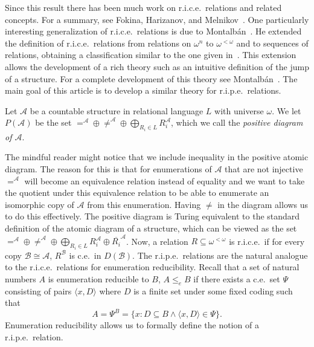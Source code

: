 \documentclass[11pt]{amsart}
\newcommand{\A}{{\mathcal{A}}}
\newcommand{\B}{{\mathcal{B}}}
\renewcommand{\bar}[1]{\overline{#1}}
\begin{document}
Since this result there has been much work on r.i.c.e.\ relations and related concepts. For a summary, see Fokina, Harizanov, and Melnikov~\cite{fokina2014}. One particularly interesting generalization of r.i.c.e.\ relations is due to Montalb\'an~\cite{montalban2012}. He extended the definition of r.i.c.e.\ relations from relations on $\omega^n$ to $\omega^{<\omega}$ and to sequences of relations, obtaining a classification similar to the one given in~\cite{ash1989,chisholm1990}. This extension allows the development of a rich theory such as an intuitive definition of the jump of a structure. For a complete development of this theory see Montalb\'an~\cite{montalban2021a}. The main goal of this article is to develop a similar theory for r.i.p.e.\ relations.%
\begin{defn}\label{def:posdiagram}
Let $\A$ be a countable structure in relational language $L$ with universe $\omega$. We let $P(\A)$ be the set $=^\A\oplus \neq^\A\oplus\bigoplus_{R_i\in L}R_i^\A$, which we call the \emph{positive diagram of $\A$}.
\end{defn}
The mindful reader might notice that we include inequality in the positive atomic diagram. The reason for this is that for enumerations of $\A$ that are not injective $=^\A$ will become an equivalence relation instead of equality and we want to take the quotient under this equivalence relation to be able to enumerate an isomorphic copy of $\A$ from this enumeration. Having $\neq$ in the diagram allows us to do this effectively. The positive diagram is Turing equivalent to the standard definition of the atomic diagram of a structure, which can be viewed as the set $=^\A\oplus \neq^\A\oplus\bigoplus_{R_i\in L}R_i^\A\oplus \bar{R_i}^\A$. Now, a relation $R\subseteq\omega^{<\omega}$ is r.i.c.e.\ if for every copy $\B\cong \A$, $R^\B$ is c.e.\ in $D(\B)$. 
The r.i.p.e.\ relations are the natural analogue to the r.i.c.e.\ relations for enumeration reducibility. Recall that a set of natural numbers $A$ is enumeration reducible to $B$, $A\leq_e B$ if there exists a c.e.\ set $\Psi$ consisting of pairs $\langle x,D\rangle$ where $D$ is a finite set under some fixed coding such that
\[ A=\Psi^B=\{x: D\subseteq B \land \langle x,D \rangle \in \Psi\}. \]
Enumeration reducibility allows us to formally define the notion of a r.i.p.e.\ relation.
\end{document}
